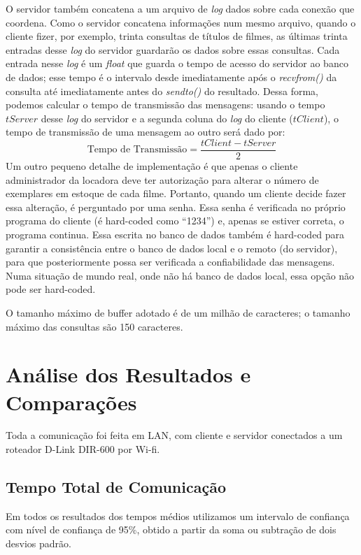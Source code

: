 \documentclass[12pt,a4paper]{article}
\begin{document}
O servidor também concatena a um arquivo de {\it log} dados sobre cada conexão que coordena. Como o servidor concatena informações num mesmo arquivo, quando o cliente fizer, por exemplo, trinta consultas de títulos de filmes, as últimas trinta entradas desse {\it log} do servidor guardarão os dados sobre essas consultas. Cada entrada nesse {\it log} é um {\it float} que guarda o tempo de acesso do servidor ao banco de dados; esse tempo é o intervalo desde imediatamente após o {\it recvfrom()} da consulta até imediatamente antes do {\it sendto()} do resultado. Dessa forma, podemos calcular o tempo de transmissão das mensagens: usando o tempo $ tServer $ desse {\it log} do servidor e a segunda coluna do {\it log} do cliente ($ tClient $), o tempo de transmissão de uma mensagem ao outro será dado por:
\begin{equation}
{\text {Tempo de Transmissão}} = \frac{tClient - tServer}{2}
\label{eqn:time}
\end{equation}
Um outro pequeno detalhe de implementação é que apenas o cliente administrador da locadora deve ter autorização para alterar o número de exemplares em estoque de cada filme. Portanto, quando um cliente decide fazer essa alteração, é perguntado por uma senha. Essa senha é verificada no próprio programa do cliente (é hard-coded como “1234”) e, apenas se estiver correta, o programa continua. Essa escrita no banco de dados também é hard-coded para garantir a consistência entre o banco de dados local e o remoto (do servidor), para que posteriormente possa ser verificada a confiabilidade das mensagens. Numa situação de mundo real, onde não há banco de dados local, essa opção não pode ser hard-coded.

O tamanho máximo de buffer adotado é de um milhão de caracteres; o tamanho máximo das consultas são 150 caracteres.


\section{Análise dos Resultados e Comparações}

Toda a comunicação foi feita em LAN, com cliente e servidor conectados a um roteador D-Link DIR-600 por Wi-fi.

\subsection{Tempo Total de Comunicação}
Em todos os resultados dos tempos médios utilizamos um intervalo de confiança com nível de confiança de 95\%, obtido a partir da soma ou subtração de dois desvios padrão.
\end{document}
